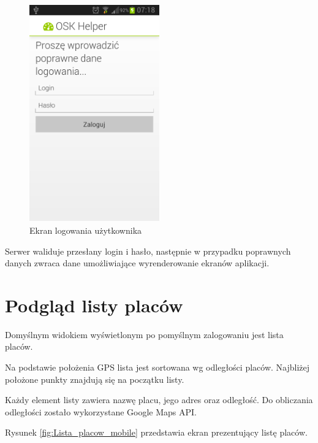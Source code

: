 \documentclass[twoside,a4paper,openright,12pt]{book}
\begin{document}
\begin{figure}[H]
\centering
\includegraphics[width=0.5\textwidth]{screenshots/android/logowanie.png}
\caption{Ekran logowania użytkownika}
\label{fig:Logowanie_mobile}
\end{figure}

Serwer waliduje przesłany login i hasło, następnie w przypadku poprawnych danych zwraca dane umożliwiające wyrenderowanie ekranów aplikacji.


\section{Podgląd listy placów}
Domyślnym widokiem wyświetlonym po pomyślnym zalogowaniu jest lista placów.

Na podstawie położenia GPS lista jest sortowana wg odległości placów. Najbliżej położone punkty znajdują się na początku listy.

Każdy element listy zawiera nazwę placu, jego adres oraz odległość. Do obliczania odległości zostało wykorzystane Google Maps API.

Rysunek \ref{fig:Lista_placow_mobile} przedstawia ekran prezentujący listę placów.
\end{document}
